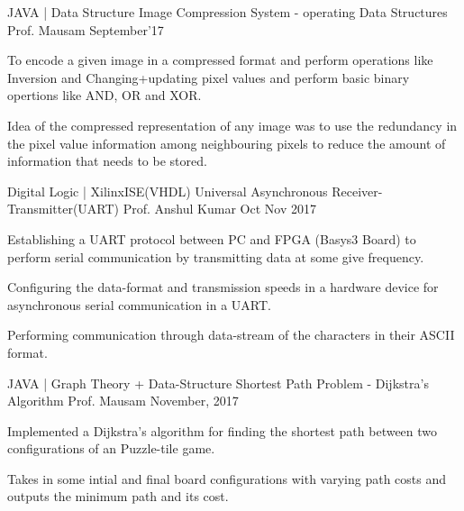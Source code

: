 

\begin{cventries}

  \cventry
    {JAVA | Data Structure} %
    {Image Compression System - operating Data Structures} %
    {Prof. Mausam } %
    {September’17} %
    {
      \begin{cvitems} %
        \item {To encode a given image in a compressed format and perform operations like Inversion and Changing+updating pixel values and perform basic binary opertions like AND, OR and XOR.}
        \item {Idea of the compressed representation of any image
was to use the redundancy in the pixel value information
among neighbouring pixels to
reduce the amount of information
that needs to be stored.}
      \end{cvitems}
    }

  \cventry
    {Digital Logic | XilinxISE(VHDL)  } %
    {Universal Asynchronous Receiver-Transmitter(UART)} %
    {Prof. Anshul Kumar} %
    {Oct Nov 2017} %
    {
      \begin{cvitems} %
        \item {Establishing a UART protocol between PC and FPGA (Basys3 Board) to perform serial communication by transmitting data at some give frequency.}
        \item { Configuring the data-format and transmission speeds in a hardware device for asynchronous serial communication in a UART. }
        \item {Performing communication through data-stream of the characters in
their ASCII format.}
      \end{cvitems}
    }

  \cventry
    {JAVA | Graph Theory + Data-Structure} %
    {Shortest Path Problem - Dijkstra's Algorithm} %
    {Prof. Mausam
} %
    { November, 2017} %
    {
      \begin{cvitems} %
        \item {Implemented a Dijkstra’s algorithm for finding the shortest path between two configurations
of an Puzzle-tile game.}
        \item {Takes in some intial
and final board configurations
with varying path costs and outputs the minimum path and its cost.}
      \end{cvitems}
    }


\end{cventries}
